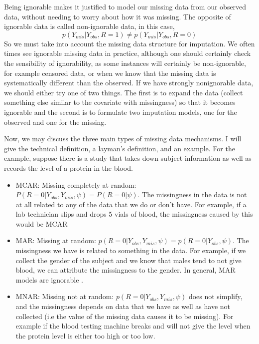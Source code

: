 Being ignorable makes it justified to model our missing data from our observed data, without needing to worry about how it was missing.
The opposite of ignorable data is called non-ignorable data, in this case, 
$$p(Y_{mis}|Y_{obs},R=1)\neq p(Y_{mis}|Y_{obs},R=0)$$
So we must take into account the missing data structure for imputation.
We often times see ignorable missing data in practice, although one should certainly check the sensibility of ignorability, as some instances will certainly be non-ignorable, for example censored data, or when we know that the missing data is systematically different than the observed. If we have strongly nonignorable data, we should either try one of two things. The first is to expand the data (collect something else similar to the covariate with missingness) so that it becomes ignorable and the second is to formulate two imputation models, one for the observed and one for the missing.

Now, we may discuss the three main types of missing data mechanisms. I will give the technical definition, a layman's definition, and an example. For the example, suppose there is a study that takes down subject information as well as records the level of a protein in the blood.
\begin{itemize}
\item MCAR: Missing completely at random:  $P(R=0|Y_{obs},Y_{mis},\psi)=P(R=0|\psi)$. The missingness in the data is not at all related to any of the data that we do or don't have. For example, if a lab technician slips and drops 5 vials of blood, the missingness caused by this would be MCAR
\item MAR: Missing at random: $p(R=0|Y_{obs},Y_{mis},\psi)= p(R=0|Y_{obs},\psi)$. The missingness we have is related to something in the data. For example, if we collect the gender of the subject and we know that males tend to not give blood, we can attribute the missingness to the gender. In general, MAR models are ignorable \cite{VanBuuren2012}.
\item MNAR: Missing not at random: $p(R=0|Y_{obs},Y_{mis},\psi)$ does not simplify, and the missingness depends on data that we have as well as have not collected (i.e the value of the missing data causes it to be missing). For example if the blood testing machine breaks and will not give the level when the protein level is either too high or too low.
\end{itemize}


